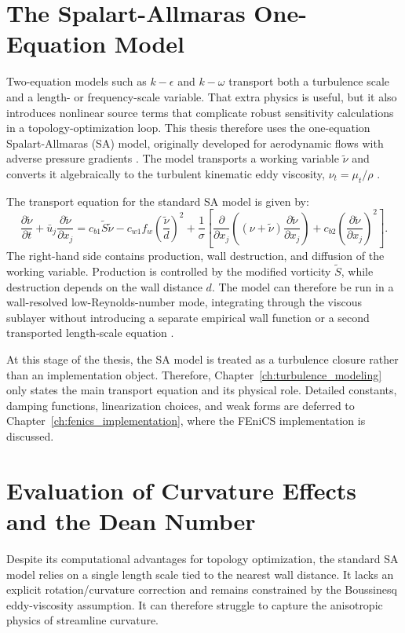 \section{The Spalart-Allmaras One-Equation Model}
Two-equation models such as $k-\epsilon$ and $k-\omega$ transport both a turbulence scale and a length- or frequency-scale variable. That extra physics is useful, but it also introduces nonlinear source terms that complicate robust sensitivity calculations in a topology-optimization loop. This thesis therefore uses the one-equation Spalart-Allmaras (SA) model, originally developed for aerodynamic flows with adverse pressure gradients \cite{Spalart1992}. The model transports a working variable $\tilde{\nu}$ and converts it algebraically to the turbulent kinematic eddy viscosity, $\nu_t=\mu_t/\rho$ \cite{Spalart1994}.

The transport equation for the standard SA model is given by:
\begin{equation}
	\frac{\partial \tilde{\nu}}{\partial t} + \bar{u}_j \frac{\partial \tilde{\nu}}{\partial x_j} = c_{b1} \tilde{S} \tilde{\nu} - c_{w1} f_w \left( \frac{\tilde{\nu}}{d} \right)^2 + \frac{1}{\sigma} \left[ \frac{\partial}{\partial x_j} \left( (\nu + \tilde{\nu}) \frac{\partial \tilde{\nu}}{\partial x_j} \right) + c_{b2} \left( \frac{\partial \tilde{\nu}}{\partial x_j} \right)^2 \right] .
	\label{eq:sa_transport}
\end{equation}
The right-hand side contains production, wall destruction, and diffusion of the working variable. Production is controlled by the modified vorticity $\tilde{S}$, while destruction depends on the wall distance $d$. The model can therefore be run in a wall-resolved low-Reynolds-number mode, integrating through the viscous sublayer without introducing a separate empirical wall function or a second transported length-scale equation \cite{NasaTurb}.

At this stage of the thesis, the SA model is treated as a turbulence closure rather than an implementation object. Therefore, Chapter~\ref{ch:turbulence_modeling} only states the main transport equation and its physical role. Detailed constants, damping functions, linearization choices, and weak forms are deferred to Chapter~\ref{ch:fenics_implementation}, where the FEniCS implementation is discussed.

\section{Evaluation of Curvature Effects and the Dean Number}
\label{sec:curvature_effects}
Despite its computational advantages for topology optimization, the standard SA model relies on a single length scale tied to the nearest wall distance. It lacks an explicit rotation/curvature correction and remains constrained by the Boussinesq eddy-viscosity assumption. It can therefore struggle to capture the anisotropic physics of streamline curvature.

